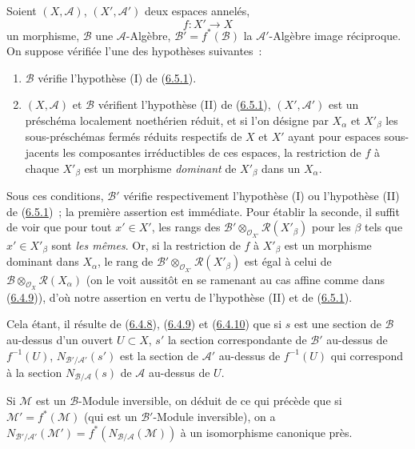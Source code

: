\begin{env}[6.5.4]
\label{II.6.5.4-fr}
Soient $(X,\mathcal{A})$, $(X',\mathcal{A}')$ deux espaces annelés,
\[
f:X'\to X
\]
un morphisme, $\mathcal{B}$ une $\mathcal{A}$-Algèbre,
$\mathcal{B}'=f^*(\mathcal{B})$ la $\mathcal{A}'$-Algèbre image réciproque. On
suppose vérifiée l'une des hypothèses suivantes~:
\begin{enumerate}
\item[$1^\circ$] $\mathcal{B}$ vérifie l'hypothèse (I) de
(\hyperref[II.6.5.1-fr]{6.5.1}).
\item[$2^\circ$] $(X,\mathcal{A})$ et $\mathcal{B}$ vérifient l'hypothèse
(II) de (\hyperref[II.6.5.1-fr]{6.5.1}), $(X',\mathcal{A}')$ est un préschéma
localement noethérien réduit, et si l'on désigne par $X_\alpha$ et
$X'_\beta$ les sous-préschémas fermés réduits respectifs de $X$ et $X'$ ayant
pour espaces sous-jacents les composantes irréductibles de ces espaces, la
restriction de $f$ à chaque $X'_\beta$ est un morphisme \emph{dominant} de
$X'_\beta$ dans un $X_\alpha$.
\end{enumerate}

Sous ces conditions, $\mathcal{B}'$ vérifie respectivement l'hypothèse (I) ou
l'hypothèse (II) de (\hyperref[II.6.5.1-fr]{6.5.1})~; la première assertion
est immédiate. Pour établir la seconde, il suffit de voir que pour tout
$x'\in X'$, les rangs des
$\mathcal{B}'\otimes_{\mathcal{O}_{X'}}\mathcal{R}(X'_\beta)$ pour les $\beta$
tels que $x'\in X'_\beta$ sont \emph{les mêmes}. Or, si la restriction de $f$
à $X'_\beta$ est un morphisme dominant dans $X_\alpha$, le rang de
$\mathcal{B}'\otimes_{\mathcal{O}_{X'}}\mathcal{R}(X'_\beta)$ est égal à celui
de $\mathcal{B}\otimes_{\mathcal{O}_X}\mathcal{R}(X_\alpha)$ (on le voit
aussitôt en se ramenant au
cas affine comme dans
(\hyperref[II.6.4.9-fr]{6.4.9})), d'où notre assertion en vertu de l'hypothèse
(II) et de (\hyperref[II.6.5.1-fr]{6.5.1}).

Cela étant, il résulte de (\hyperref[II.6.4.8-fr]{6.4.8}),
(\hyperref[II.6.4.9-fr]{6.4.9}) et (\hyperref[II.6.4.10-fr]{6.4.10}) que si
$s$ est une section de $\mathcal{B}$ au-dessus d'un ouvert $U\subset X$,
$s'$ la section correspondante de $\mathcal{B}'$ au-dessus de $f^{-1}(U)$,
$N_{\mathcal{B}'/\mathcal{A}'}(s')$ est la section de $\mathcal{A}'$ au-dessus
de $f^{-1}(U)$ qui correspond à la section
$N_{\mathcal{B}/\mathcal{A}}(s)$ de $\mathcal{A}$ au-dessus de $U$.

Si $\mathcal{M}$ est un $\mathcal{B}$-Module inversible, on déduit de ce qui
précède que si $\mathcal{M}'=f^*(\mathcal{M})$ (qui est un
$\mathcal{B}'$-Module inversible), on a
$N_{\mathcal{B}'/\mathcal{A}'}(\mathcal{M}')
=f^*(N_{\mathcal{B}/\mathcal{A}}(\mathcal{M}))$ à un isomorphisme canonique
près.
\end{env}

